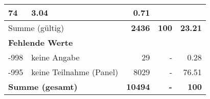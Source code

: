 \begin{longtable}{lXrrr}
       \num{74} &
       \num[round-mode=places,round-precision=2]{3,04} &
         \num[round-mode=places,round-precision=2]{0,71} \\
     \midrule
     \multicolumn{2}{l}{Summe (gültig)} &
       \textbf{\num{2436}} &
     \textbf{100} &
       \textbf{\num[round-mode=places,round-precision=2]{23,21}} \\
     \multicolumn{5}{l}{\textbf{Fehlende Werte}}\\
       -998 &
       keine Angabe &
         \num{29} &
        - &
         \num[round-mode=places,round-precision=2]{0,28} \\
       -995 &
       keine Teilnahme (Panel) &
         \num{8029} &
        - &
         \num[round-mode=places,round-precision=2]{76,51} \\
     \midrule
     \multicolumn{2}{l}{\textbf{Summe (gesamt)}} &
          \textbf{\num{10494}} &
        \textbf{-} &
        \textbf{100} \\
     \bottomrule
     \end{longtable}
     

